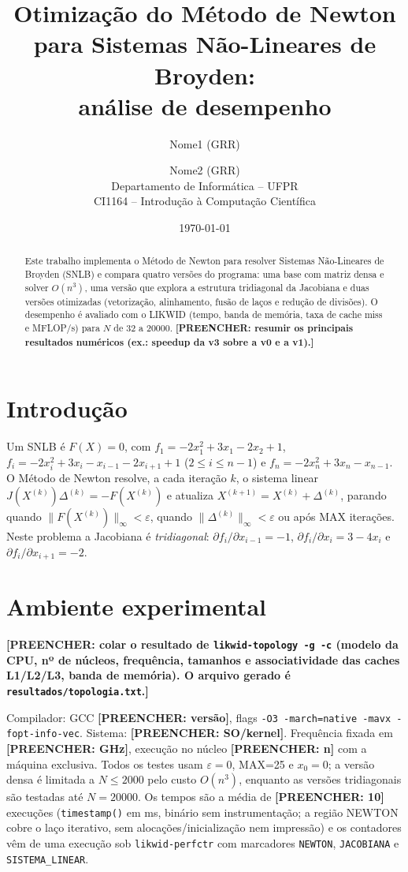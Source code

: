 \documentclass[10pt,a4paper]{article}
\title{Otimização do Método de Newton para Sistemas Não-Lineares de Broyden:\\ análise de desempenho}
\author{Nome1 (GRR) \and Nome2 (GRR)\\
Departamento de Informática -- UFPR\\ CI1164 -- Introdução à Computação Científica}
\date{\today}
\newcommand{\preencher}[1]{\textbf{[PREENCHER: #1]}}
\begin{document}
\maketitle

\begin{abstract}
Este trabalho implementa o Método de Newton para resolver Sistemas Não-Lineares de Broyden (SNLB)
e compara quatro versões do programa: uma base com matriz densa e solver $O(n^3)$, uma versão que explora a
estrutura tridiagonal da Jacobiana e duas versões otimizadas (vetorização, alinhamento, fusão de laços e
redução de divisões). O desempenho é avaliado com o LIKWID (tempo, banda de memória, taxa de cache miss
e MFLOP/s) para $N$ de 32 a 20000. \preencher{resumir os principais resultados numéricos (ex.: speedup da v3 sobre a v0 e a v1).}
\end{abstract}

\section{Introdução}
Um SNLB é $F(X)=0$, com $f_1=-2x_1^2+3x_1-2x_2+1$, $f_i=-2x_i^2+3x_i-x_{i-1}-2x_{i+1}+1$ ($2\le i\le n-1$)
e $f_n=-2x_n^2+3x_n-x_{n-1}$. O Método de Newton resolve, a cada iteração $k$, o sistema linear
$J(X^{(k)})\Delta^{(k)}=-F(X^{(k)})$ e atualiza $X^{(k+1)}=X^{(k)}+\Delta^{(k)}$, parando quando
$\|F(X^{(k)})\|_\infty<\varepsilon$, quando $\|\Delta^{(k)}\|_\infty<\varepsilon$ ou após MAX iterações.
Neste problema a Jacobiana é \emph{tridiagonal}: $\partial f_i/\partial x_{i-1}=-1$,
$\partial f_i/\partial x_i=3-4x_i$ e $\partial f_i/\partial x_{i+1}=-2$.

\section{Ambiente experimental}
\preencher{colar o resultado de \texttt{likwid-topology -g -c} (modelo da CPU, nº de núcleos, frequência, tamanhos e associatividade das caches L1/L2/L3, banda de memória). O arquivo gerado é \texttt{resultados/topologia.txt}.}
\par\smallskip
Compilador: GCC \preencher{versão}, flags \texttt{-O3 -march=native -mavx -fopt-info-vec}. Sistema: \preencher{SO/kernel}.
Frequência fixada em \preencher{GHz}, execução no núcleo \preencher{n} com a máquina exclusiva.
Todos os testes usam $\varepsilon=0$, MAX=25 e $x_0=0$; a versão densa é limitada a $N\leq 2000$ pelo custo $O(n^3)$, enquanto as versões tridiagonais são testadas até $N=20000$. Os tempos são a média de \preencher{10} execuções
(\texttt{timestamp()} em ms, binário sem instrumentação; a região NEWTON cobre o laço iterativo, sem alocações/inicialização nem impressão) e os contadores vêm de uma execução sob \texttt{likwid-perfctr}
com marcadores \texttt{NEWTON}, \texttt{JACOBIANA} e \texttt{SISTEMA\_LINEAR}.
\end{document}
